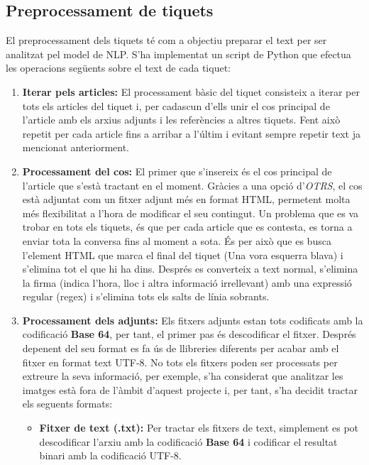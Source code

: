 \subsection{Preprocessament de tiquets}
El preprocessament dels tiquets té com a objectiu preparar el text per ser analitzat pel model de NLP. S'ha implementat un script de Python que efectua les operacions següents sobre el text de cada tiquet:
\begin{enumerate}
     \item \textbf{Iterar pels articles:} El processament bàsic del tiquet consisteix a iterar per tots els articles del tiquet i, per cadascun d'ells unir el cos principal de l'article amb els arxius adjunts i les referències a altres tiquets. Fent això repetit per cada article fins a arribar a l'últim i evitant sempre repetir text ja mencionat anteriorment.
     \item \textbf{Processament del cos:} El primer que s'insereix és el cos principal de l'article que s'està tractant en el moment. Gràcies a una opció d'\textit{OTRS}, el cos està adjuntat com un fitxer adjunt més en format HTML, permetent molta més flexibilitat a l'hora de modificar el seu contingut. Un problema que es va trobar en tots els tiquets, és que per cada article que es contesta, es torna a enviar tota la conversa fins al moment a sota. És per això que es busca l'element HTML que marca el final del tiquet (Una vora esquerra blava) i s'elimina tot el que hi ha dins. Després es converteix a text normal, s'elimina la firma (indica l'hora, lloc i altra informació irrellevant) amb una expressió regular (regex) i s'elimina tots els salts de línia sobrants.
     \item \textbf{Processament dels adjunts:} Els fitxers adjunts estan tots codificats amb la codificació \textbf{Base 64}, per tant, el primer pas és descodificar el fitxer. Després depenent del seu format es fa ús de llibreries diferents per acabar amb el fitxer en format text UTF-8. No tots els fitxers poden ser processats per extreure la seva informació, per exemple, s'ha considerat que analitzar les imatges està fora de l'àmbit d'aquest projecte i, per tant, s'ha decidit tractar els seguents formats:
          \begin{itemize}
               \item \textbf{Fitxer de text (.txt):} Per tractar els fitxers de text, simplement es pot descodificar l'arxiu amb la codificació \textbf{Base 64} i codificar el resultat binari amb la codificació UTF-8.

\end{itemize}
\end{enumerate}
